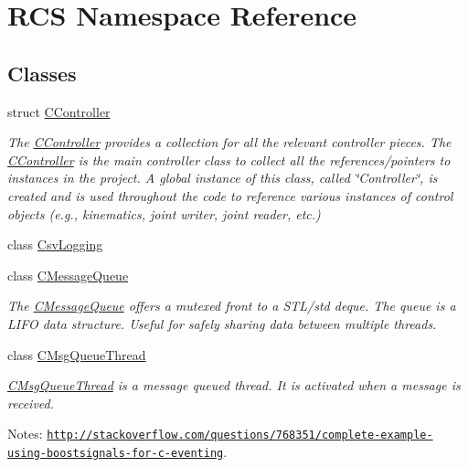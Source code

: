 \hypertarget{namespaceRCS}{\section{R\-C\-S Namespace Reference}
\label{namespaceRCS}
}
\subsection*{Classes}
\begin{DoxyCompactItemize}
\item 
struct \hyperlink{structRCS_1_1CController}{C\-Controller}
\begin{DoxyCompactList}\small\item\em The \hyperlink{structRCS_1_1CController}{C\-Controller} provides a collection for all the relevant controller pieces. The \hyperlink{structRCS_1_1CController}{C\-Controller} is the main controller class to collect all the references/pointers to instances in the project. A global instance of this class, called \char`\"{}\-Controller\char`\"{}, is created and is used throughout the code to reference various instances of control objects (e.\-g., kinematics, joint writer, joint reader, etc.) \end{DoxyCompactList}\item 
class \hyperlink{classRCS_1_1CsvLogging}{Csv\-Logging}
\item 
class \hyperlink{classRCS_1_1CMessageQueue}{C\-Message\-Queue}
\begin{DoxyCompactList}\small\item\em The \hyperlink{classRCS_1_1CMessageQueue}{C\-Message\-Queue} offers a mutexed front to a S\-T\-L/std deque. The queue is a L\-I\-F\-O data structure. Useful for safely sharing data between multiple threads. \end{DoxyCompactList}\item 
class \hyperlink{classRCS_1_1CMsgQueueThread}{C\-Msg\-Queue\-Thread}
\begin{DoxyCompactList}\small\item\em \hyperlink{classRCS_1_1CMsgQueueThread}{C\-Msg\-Queue\-Thread} is a message queued thread. It is activated when a message is received. \par
 Notes\-: \href{http://stackoverflow.com/questions/768351/complete-example-using-boostsignals-for-c-eventing}{\tt http\-://stackoverflow.\-com/questions/768351/complete-\/example-\/using-\/boostsignals-\/for-\/c-\/eventing}. \end{DoxyCompactList}\item 

\end{DoxyCompactItemize}
